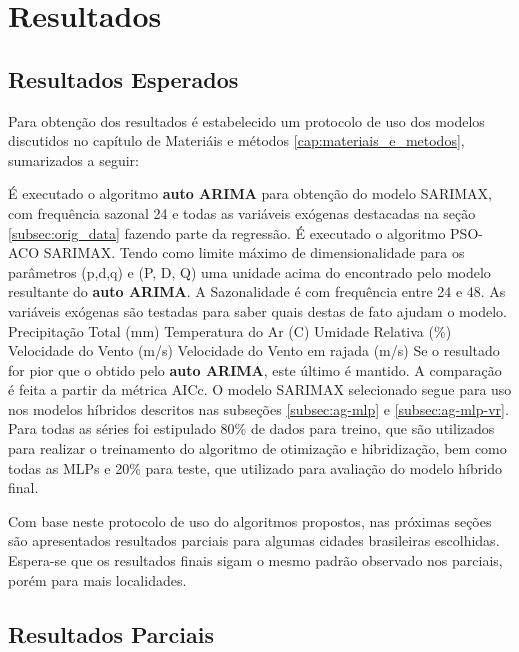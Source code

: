 \chapter{Resultados}
\label{cap:resultados}

\section{Resultados Esperados}

Para obtenção dos resultados é estabelecido um protocolo de uso dos modelos discutidos no capítulo de Materiáis e métodos \ref{cap:materiais_e_metodos}, sumarizados a seguir:

\begin{outline}[enumerate]
    \1 É executado o algoritmo \textbf{auto ARIMA} para obtenção do modelo SARIMAX, com frequência sazonal 24 e todas as variáveis exógenas destacadas na seção \ref{subsec:orig_data} fazendo parte da regressão.
    \1 É executado o algoritmo PSO-ACO SARIMAX.
        \2 Tendo como limite máximo de dimensionalidade para os parâmetros (p,d,q) e (P, D, Q) uma unidade acima do encontrado pelo modelo resultante do \textbf{auto ARIMA}.
        \2 A Sazonalidade é com frequência entre 24 e 48.
        \2 As variáveis exógenas são testadas para saber quais destas de fato ajudam o modelo.
            \3 Precipitação Total (mm)
            \3 Temperatura do Ar (\textdegree{}C)
            \3 Umidade Relativa (\%)
            \3 Velocidade do Vento (m/s)
            \3 Velocidade do Vento em rajada (m/s)
        \2 Se o resultado for pior que o obtido pelo \textbf{auto ARIMA}, este último é mantido. A comparação é feita a partir da métrica AICc.
    \1 O modelo SARIMAX selecionado segue para uso nos modelos híbridos descritos nas subseções \ref{subsec:ag-mlp} e \ref{subsec:ag-mlp-vr}.
        \2 Para todas as séries foi estipulado 80\% de dados para treino, que são utilizados para realizar o treinamento do algoritmo de otimização e hibridização, bem como todas as MLPs e 20\% para teste, que utilizado para avaliação do modelo híbrido final.
\end{outline}

Com base neste protocolo de uso do algoritmos propostos, nas próximas seções são apresentados resultados parciais para algumas cidades brasileiras escolhidas. Espera-se que os resultados finais sigam o mesmo padrão observado nos parciais, porém para mais localidades.

\section{Resultados Parciais}

